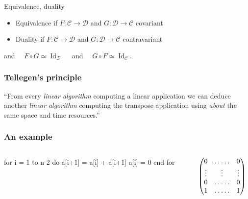 \documentclass[10pt]{beamer}
\newcommand{\cat}[1]{\mathscr{#1}}
\newcommand{\C}{\cat{C}}
\newcommand{\D}{\cat{D}}
\newcommand{\comp}{\circ}
\DeclareMathOperator{\Id}{Id}
\newcommand{\ra}{\rightarrow}
\begin{document}
\begin{frame}
  \begin{block}{Equivalence, duality}
    \begin{itemize}
    \item Equivalence if $F:\C\ra\D$ and $G:\D\ra\C$ covariant
    \item Duality if $F:\C\ra\D$ and $G:\D\ra\C$ contravariant 
    \end{itemize}
    and $\quad F\comp G \simeq \Id_\D\quad$ and $\quad G\comp F \simeq \Id_\C$.
  \end{block}
  
\end{frame}


\begin{frame}
  \frametitle{Tellegen's principle}

  \Large
  \begin{center}
    ``From every \alert{\emph{linear algorithm}} computing a linear
    application we can deduce another \alert{\emph{linear algorithm}}
    computing the transpose application using \emph{about} the same
    space and time resources.''
  \end{center}
\end{frame}


\begin{frame}[fragile]
  \frametitle{An example}

  \begin{columns}

    \begin{column}{0.5\textwidth}
      \begin{center}
        \begin{minipage}{0.7\textwidth}
\begin{semiverbatim}
  for i = 1 to n-2 do
    a[i+1] = a[i] + a[i+1]
    a[i] = 0
  end for
\end{semiverbatim}
        \end{minipage}
      \end{center}
    \end{column}

    \begin{column}{0.5\textwidth}

      \begin{equation*}
        \begin{pmatrix}
          0 & \hdotsfor{3} & 0\\
          \vdots  &  &\vdots&& \vdots \\
          0 & \hdotsfor{3} & 0\\
          1 & \hdotsfor{3} & 1
        \end{pmatrix}
      \end{equation*}

    \end{column}
  \end{columns}
\end{frame}
\end{document}
